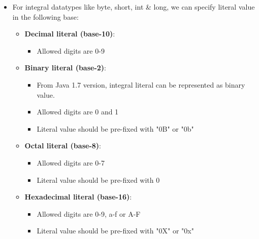
\begin{flushleft}
	
	\begin{itemize}
		\item For integral datatypes like byte, short, int \& long, we can specify literal value in the following base:
		\begin{itemize}
			\item \textbf{Decimal literal (base-10)}:
			\begin{itemize}
				\item Allowed digits are 0-9
			\end{itemize}

		\item \textbf{Binary literal (base-2)}:
		\begin{itemize}
			\item From Java 1.7 version, integral literal can be represented as binary value.
			\item Allowed digits are 0 and 1
			\item Literal value should be pre-fixed with "0B" or "0b"
		\end{itemize}

			
		\item \textbf{Octal literal (base-8)}:
		\begin{itemize}
			\item Allowed digits are 0-7
			\item Literal value should be pre-fixed with 0
		\end{itemize}
	
		\item \textbf{Hexadecimal literal (base-16)}:
		\begin{itemize}
			\item Allowed digits are 0-9, a-f or A-F
			\item Literal value should be pre-fixed with "0X" or "0x"
		\end{itemize}


\end{itemize}
\end{itemize}
\end{flushleft}
